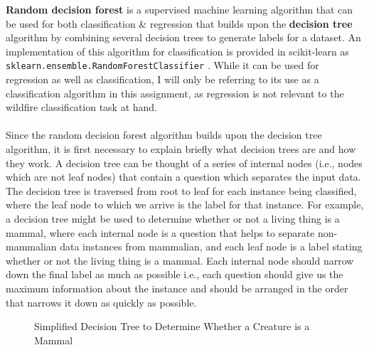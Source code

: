 \documentclass[a4paper]{article}
\begin{document}
\textbf{Random decision forest} is a supervised machine learning algorithm that can be used for both classification \& regression that builds upon the \textbf{decision tree} algorithm by combining several decision trees to generate labels for a dataset.
An implementation of this algorithm for classification is provided in scikit-learn as \texttt{sklearn.ensemble.RandomForestClassifier} \supercite{scikit_randomforestclassifier}.
While it can be used for regression as well as classification, I will only be referring to its use as a classification algorithm in this assignment, as regression is not relevant to the wildfire classification task at hand.
\\\\
Since the random decision forest algorithm builds upon the decision tree algorithm, it is first necessary to explain briefly what decision trees are and how they work.
A decision tree can be thought of a series of internal nodes (i.e., nodes which are not leaf nodes) that contain a question which separates the input data.
The decision tree is traversed from root to leaf for each instance being classified, where the leaf node to which we arrive is the label for that instance.
For example, a decision tree might be used to determine whether or not a living thing is a mammal, where each internal node is a question that helps to separate non-mammalian data instances from mammalian, and each leaf node is a label stating whether or not the living thing is a mammal.
Each internal node should narrow down the final label as much as possible i.e., each question should give us the maximum information about the instance and should be arranged in the order that narrows it down as quickly as possible.

\begin{figure}[H]
    \centering
    \caption{Simplified Decision Tree to Determine Whether a Creature is a Mammal}
\end{figure}
\end{document}
